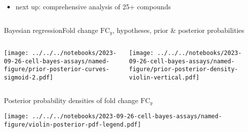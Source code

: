 \documentclass[aspectratio=169]{beamer}
\begin{document}
\begin{frame}
\begin{columns}[t]
\begin{column}{0.5\textwidth}
\begin{itemize}
\item<2> next up: comprehensive analysis of 25+ compounds
\end{itemize}

\end{column}
\end{columns}
\end{frame}

\begin{frame}{Bayesian regression}{Fold change $\mathrm{FC}_y$, hypotheses,
  prior \& posterior probabilities}
\begin{columns}[t]
\begin{column}{0.5\textwidth}

\texttt{[image: ../../../notebooks/2023-09-26-cell-bayes-assays/named-figure/prior-posterior-curves-sigmoid-2.pdf]}
\end{column}
\begin{column}{0.5\textwidth}

\texttt{[image: ../../../notebooks/2023-09-26-cell-bayes-assays/named-figure/prior-posterior-density-violin-vertical.pdf]}
\end{column}
\end{columns}
\end{frame}

\begin{frame}{Posterior probability densities of fold change $\mathrm{FC}_y$}
\begin{center}
\texttt{[image: ../../../notebooks/2023-09-26-cell-bayes-assays/named-figure/violin-posterior-pdf-legend.pdf]}
\end{center}
\end{frame}
\end{document}
